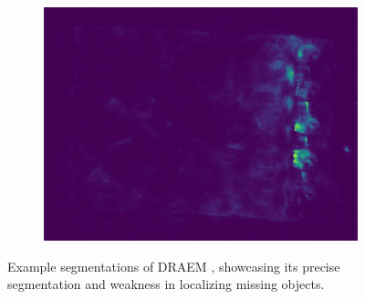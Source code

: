 \begin{figure}[H]
\begin{subfigure}[b]{0.48\textwidth}
\begin{minipage}{0.32\textwidth}
            \centering
            \includegraphics[width=\textwidth]{figures/DRAEMweakness/logical042segment.png}
        \end{minipage}
    \end{subfigure}
    \caption{Example segmentations of DRAEM \cite{Zavrtanik_2021DRAEM}, showcasing its precise segmentation and weakness in localizing missing objects.}
    \label{fig:DRAEMweakness}
\end{figure}